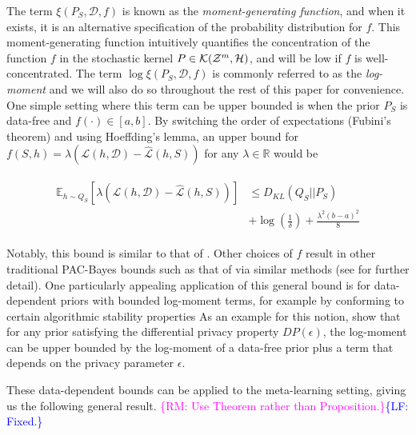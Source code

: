 \documentclass[letterpaper]{article} %
\theoremstyle{definition}
\newcommand{\Expect}[2]{\mathbb{E}_{#1}\left [#2 \right ]}
\newcommand{\RM}[1]{\textcolor{magenta}{\{RM: #1\}}}
\newcommand{\LF}[1]{\textcolor{blue}{\{LF: #1\}}}
\begin{document}
The term $\xi(P_S, \mathcal{D}, f)$ is known as the \emph{moment-generating function}, and when it exists, it is an alternative specification of the probability distribution for $f$.
This moment-generating function intuitively quantifies the concentration of the function $f$ in the stochastic kernel $P\in{\cal K}({\cal Z}^m,{\cal H})$, and will be low if $f$ is well-concentrated.
The term $\log\xi(P_S, \mathcal{D}, f)$ is commonly referred to as the \emph{log-moment} and we will also do so throughout the rest of this paper for convenience. 
One simple setting where this term can be upper bounded is when the prior $P_S$ is data-free and $f(\cdot)\in[a,b]$. By switching the order of expectations (Fubini's theorem) and using Hoeffding's lemma, an upper bound for $f(S,h)=\lambda(\mathcal{L}(h,\mathcal{D})-\hat{\mathcal{L}}(h, S))$ for any $\lambda\in \mathbb{R}$ would be

\begin{align} \label{eq:bound-aml-datafree}
\begin{split}
\Expect{h\sim Q_S}{\lambda(\mathcal{L}(h,\mathcal{D})-\hat{\mathcal{L}}(h, S))} &\leq D_{KL}(Q_S||P_S)\\
&+\log\left (\frac{1}{\delta}\right ) + \frac{\lambda^2(b-a)^2}{8}
\end{split}
\end{align}


Notably, this bound is similar to that of \citet{Catoni2004}. Other choices of $f$ result in other traditional PAC-Bayes bounds such as that of \citet{Mcallester} via similar methods (see \citet{Rivasplata2020} for further detail). 
One particularly appealing application of this general bound is for data-dependent priors with bounded log-moment terms, for example by conforming to certain algorithmic stability properties 
As an example for this notion, \citet{Rivasplata2020} show that for any prior satisfying the differential privacy property $DP(\epsilon)$, the log-moment can be upper bounded by the log-moment of a data-free prior plus a term that depends on the privacy parameter $\epsilon$. 

These data-dependent bounds can be applied to the meta-learning setting, giving us the following general result. \RM{Use Theorem rather than Proposition.}\LF{Fixed.}
\end{document}
